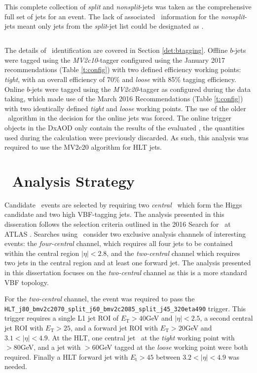 		This complete collection of \textit{split} and \textit{nonsplit}-jets was taken as the comprehensive full set of jets for an event. The lack of associated \btag\ information for the \textit{nonsplit}-jets meant only jets from the \textit{split}-jet list could be designated as \bjets.

		\subsection{\bjets}

		The details of \bjet\ identification are covered in Section \ref{det:btagging}. Offline $b$-jets were tagged using the \textit{MV2c10}-tagger configured using the January 2017 recommendations (Table \ref{t:config}) with two defined efficiency working points: \textit{tight}, with an overall efficiency of 70\% and \textit{loose} with 85\% tagging efficiency. Online $b$-jets were tagged using the \textit{MV2c20}-tagger as configured during the data taking, which made use of the March 2016 Recommendations (Table \ref{t:config}) with two identically defined \textit{tight} and \textit{loose} working points. The use of the older \btagging\ algorithm in the decision for the online jets was forced. The online trigger objects in the DxAOD only contain the results of the evaluated \btag, the quantities used during the calculation were previously discarded. As such, this analysis was required to use the MV2c20 algorithm for HLT jets.


	\section{\VBFHBB\, Analysis Strategy}
	\label{es:as}
		Candidate \VBFHBB\, events are selected by requiring two \textit{central} \bjets\, which form the Higgs candidate and two high \pt VBF-tagging jets. The analysis presented in this disseration follows the selection criteria outlined in the 2016 Search for \VBFHBB\ at ATLAS \cite{VBFHbb8tev}. Searches using \VBFHBB\, consider two exclusive analysis channels of interesting events: the \textit{four-central} channel, which requires all four jets to be contained within the central region $|\eta| < 2.8$, and the \textit{two-central} channel which requires two jets in the central region and at least one forward jet.
		The analysis presented in this dissertation focuses on the \textit{two-central} channel as this is a more standard VBF topology.

		For the \textit{two-central} channel, the event was required to pass the \texttt{HLT\_j80\_bmv2c2070\_split\_\-j60\_bmv2c2085\_split\_j45\_320eta490} trigger. This trigger requires a single L1 jet ROI of $E_\text{T} > 40$GeV and $|\eta| < 2.5$, a second central jet ROI with $E_\text{T} > 25$, and a forward jet ROI with $E_\text{T} > 20$GeV and $3.1 < |\eta| < 4.9$.
		At the HLT, one central jet \btagged\, at the \textit{tight} working point with \pt $>80$GeV, and a jet with \pt$>60$GeV tagged at the \textit{loose} working point were both required. Finally a HLT forward jet with $E_\text{t}>45$ between $3.2 < |\eta| < 4.9$ was needed.

